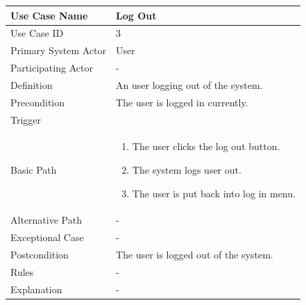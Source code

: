 \documentclass[a4paper,12pt]{report}
\begin{document}
		\begin{tabular}{|m{4cm}|m{11.5cm}|}
			\hline
				Use Case Name & Log Out\\
			\hline
				Use Case ID & 3\\
			\hline
				Primary System Actor & User\\
			\hline
				Participating Actor & -\\
			\hline
				Definition & An user logging out of the system.\\
			\hline
				Precondition & The user is logged in currently.\\
			\hline
				Trigger & \\
			\hline
				Basic Path & \begin{enumerate}
					\item The user clicks the log out button.
					\item The system logs user out.
					\item The user is put back into log in menu.
				\end{enumerate}		
				\\
			\hline
				Alternative Path & -\\
			\hline
				Exceptional Case & -\\
			\hline
				Postcondition & The user is logged out of the system.\\
			\hline
				Rules & -\\
			\hline
				Explanation & -\\
			\hline
		\end{tabular}
\end{document}
